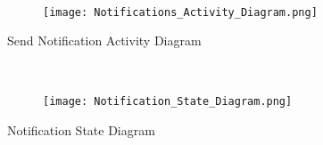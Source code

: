 \documentclass{article}
\begin{document}
    \mbox{}\\
    \bigskip
    \clearpage
    
    \begin{figure}[h!]
        \texttt{[image: Notifications\_Activity\_Diagram.png]}
    \end{figure}
    Send Notification Activity Diagram
    
    \mbox{}\\
    \bigskip
    \clearpage
    
    \begin{figure}[h!]
        \begin{center}
            \texttt{[image: Notification\_State\_Diagram.png]}
        \end{center}
    \end{figure}
    Notification State Diagram
    
    \mbox{}\\
\end{document}
